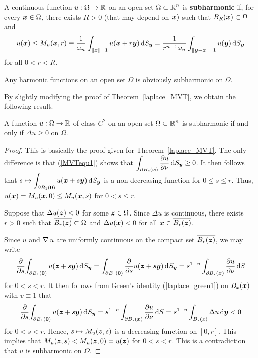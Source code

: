 \begin{defn}
A continuous function $u:\Omega \to \RR$ on an open set
$\displaystyle \Omega \subset \RR^n$ is
{\bfseries subharmonic}
if, for every $\VEC{x} \in \Omega$, there exists $R>0$ (that may depend
on $\VEC{x})$ such that $B_R(\VEC{x}) \subset \Omega$ and
\[
u(\VEC{x}) \leq M_u(\VEC{x},r) \equiv \frac{1}{\omega_n}
\int_{\|\VEC{x}\|=1} u(\VEC{x} + r\VEC{y}) \dss{S}{y}
= \frac{1}{r^{n-1}\omega_n} \int_{\|\VEC{y}-\VEC{x}\|=1} u(\VEC{y}) \dss{S}{y}
\]
for all $0<r<R$.
\end{defn}

Any harmonic functions on an open set $\Omega$ is obviously
subharmonic on $\Omega$.

By slightly modifying the proof of Theorem~\ref{laplace_MVT}, we
obtain the following result.

\begin{prop}
A function $u:\Omega \to \RR$ of class $\displaystyle C^2$ on an open set
$\displaystyle \Omega \subset \RR^n$ is subharmonic if and only if
$\Delta u \geq 0$ on $\Omega$.
\end{prop}

\begin{proof}
\stage{$\mathbf{\Leftarrow}$}  This is basically the proof given for
Theorem~\ref{laplace_MVT}.  The only difference is that
(\ref{MVTequ1}) shows that $\displaystyle \int_{\partial B_s(\VEC{x})}
\pdydx{u}{\nu} \dss{S}{y} \geq 0$.
It then follows that
$\displaystyle s \mapsto
\int_{\partial B_1(\VEC{0})} u(\VEC{x} + s\VEC{y}) \dss{S}{y}$
is a non decreasing function for $0 \leq s \leq r$.  Thus,
$u(\VEC{x}) = M_u(\VEC{x},0) \leq M_u(\VEC{x},s)$ for $0 < s \leq r$.

\stage{$\mathbf{\Rightarrow}$}
Suppose that $\Delta u(\VEC{z}) < 0$ for some $\VEC{z} \in \Omega$.
Since $\Delta u$ is continuous, there exists $r>0$ such that
$\displaystyle \overline{B_r(\VEC{z})} \subset \Omega$ and
$\Delta u(\VEC{x}) < 0 $ for all
$\displaystyle \VEC{x} \in \overline{B_r(\VEC{z})}$.

Since $u$ and $\graD u$ are uniformly continuous on the compact set
$\displaystyle \overline{B_r(\VEC{z})}$, we may write
\[
\pdfdx{ \int_{\partial B_1(\VEC{0})} u(\VEC{z} + s\VEC{y}) \dss{S}{y} }{s}
= \int_{\partial B_1(\VEC{0})} \pdfdx{ u(\VEC{z} + s\VEC{y})}{s} \dss{S}{y}
= s^{1-n} \int_{\partial B_s(\VEC{x})} \pdydx{u}{\nu} \dx{S}
\]
for $0 < s < r$.
It then follows from Green's identity (\ref{laplace_green1}) on
$B_x(\VEC{x})$ with $v \equiv 1$ that
\[
\pdfdx{ \int_{\partial B_1(\VEC{0})} u(\VEC{z} + s\VEC{y}) \dss{S}{y} }{s}
= s^{1-n} \int_{\partial B_s(\VEC{x})} \pdydx{u}{\nu} \dx{S}
= s^{1-n} \int_{B_s{\VEC(x)}} \Delta u \dx{\VEC{y}} < 0
\]
for $0 < s < r$.  Hence, $s \mapsto M_u(\VEC{z},s)$ is a decreasing
function on $[0,r]$.  This implies that
$M_u(\VEC{z},s) < M_u(\VEC{z},0) = u(\VEC{z})$
for $0<s<r$.  This is a contradiction that $u$ is subharmonic on $\Omega$.
\end{proof}

